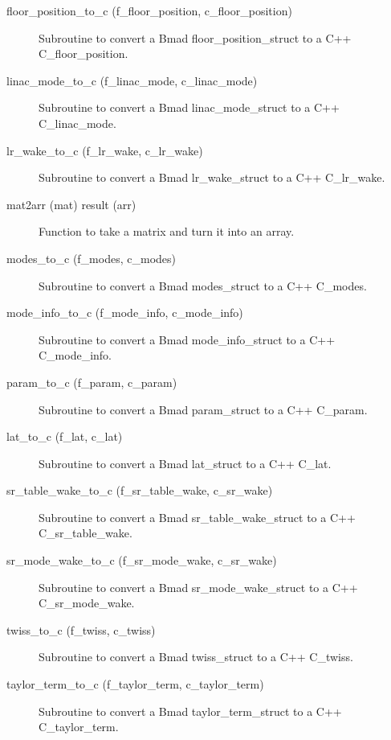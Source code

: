 \begin{description}
\item[floor_position_to_c (f_floor_position, c_floor_position)] \Newline 
Subroutine to convert a Bmad floor_position_struct to a C++ C_floor_position.

\item[linac_mode_to_c (f_linac_mode, c_linac_mode)] \Newline 
Subroutine to convert a Bmad linac_mode_struct to a C++ C_linac_mode.

\item[lr_wake_to_c (f_lr_wake, c_lr_wake)] \Newline 
Subroutine to convert a Bmad lr_wake_struct to a C++ C_lr_wake.

\item[mat2arr (mat) result (arr)] \Newline 
Function to take a matrix and turn it into an array.

\item[modes_to_c (f_modes, c_modes)] \Newline 
Subroutine to convert a Bmad modes_struct to a C++ C_modes.

\item[mode_info_to_c (f_mode_info, c_mode_info)] \Newline 
Subroutine to convert a Bmad mode_info_struct to a C++ C_mode_info.

\item[param_to_c (f_param, c_param)] \Newline 
Subroutine to convert a Bmad param_struct to a C++ C_param.

\item[lat_to_c (f_lat, c_lat)] \Newline 
Subroutine to convert a Bmad lat_struct to a C++ C_lat.

\item[sr_table_wake_to_c (f_sr_table_wake, c_sr_wake)] \Newline 
Subroutine to convert a Bmad sr_table_wake_struct to a C++ C_sr_table_wake.

\item[sr_mode_wake_to_c (f_sr_mode_wake, c_sr_wake)] \Newline 
Subroutine to convert a Bmad sr_mode_wake_struct to a C++ C_sr_mode_wake.

\item[twiss_to_c (f_twiss, c_twiss)] \Newline 
Subroutine to convert a Bmad twiss_struct to a C++ C_twiss.

\item[taylor_term_to_c (f_taylor_term, c_taylor_term)] \Newline 
Subroutine to convert a Bmad taylor_term_struct to a C++ C_taylor_term.


\end{description}
